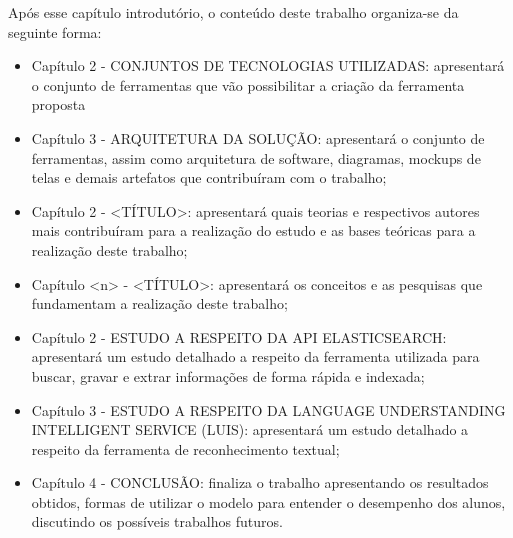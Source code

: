 Após esse capítulo introdutório, o conteúdo deste trabalho organiza-se da seguinte forma:
	\begin{itemize}
		\item{Capítulo 2 - \uppercase{Conjuntos de tecnologias utilizadas}: apresentará o conjunto de ferramentas que vão possibilitar a criação da ferramenta proposta}
		\item{Capítulo 3 - \uppercase{Arquitetura da solução}: apresentará o conjunto de ferramentas, assim como arquitetura de software, diagramas, mockups de telas e demais artefatos que contribuíram com o trabalho;}
		\item{Capítulo 2 - \uppercase{<Título>}: apresentará quais teorias e respectivos autores mais contribuíram para a realização do estudo e as bases teóricas para a realização deste trabalho;}
		\item{Capítulo <n> - \uppercase{<Título>}: apresentará os conceitos e as pesquisas que fundamentam a realização deste trabalho;}
		\item{Capítulo 2 - \uppercase{Estudo a respeito da API Elasticsearch}: apresentará um estudo detalhado a respeito da ferramenta utilizada para buscar, gravar e extrar informações de forma rápida e indexada;}
		\item{Capítulo 3 - \uppercase{Estudo a respeito da Language Understanding Intelligent Service (LUIS)}: apresentará um estudo detalhado a respeito da ferramenta de reconhecimento textual;}
		\item{Capítulo 4 - CONCLUSÃO: finaliza o trabalho apresentando os resultados obtidos, formas de utilizar o modelo para entender o desempenho dos alunos, discutindo os possíveis trabalhos futuros.}
	\end{itemize}
